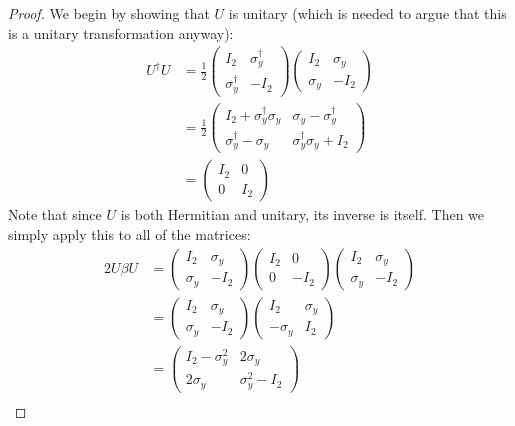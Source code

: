 \begin{proof}
	We begin by showing that $U$ is unitary (which is needed to argue that this is a unitary transformation anyway):
	\begin{align*}
		U^\dagger U &= \frac{1}{2}\begin{pmatrix}  I_2 & \sigma_y^\dagger \\ \sigma_y^\dagger & -I_2\end{pmatrix} \begin{pmatrix} I_2 & \sigma_y \\ \sigma_y & -I_2 \end{pmatrix}\\
			    &=\frac{1}{2}\begin{pmatrix} I_2 + \sigma_y^\dagger\sigma_y & \sigma_y - \sigma_y^\dagger \\ \sigma_y^\dagger - \sigma_y & \sigma_y^\dagger\sigma_y + I_2 \end{pmatrix}  \\
			    &=  \begin{pmatrix} I_2 & 0 \\ 0 & I_2 \end{pmatrix} 
	\end{align*}
	Note that since $U$ is both Hermitian and unitary, its inverse is itself. Then we simply apply this to all of the matrices:
	\begin{align*}
		2U\beta U &=  \begin{pmatrix}  I_2 & \sigma_y \\ \sigma_y & -I_2\end{pmatrix} \begin{pmatrix} I_2 & 0 \\ 0 & -I_2 \end{pmatrix} \begin{pmatrix} I_2 & \sigma_y \\ \sigma_y & -I_2 \end{pmatrix}   \\
			  &=\begin{pmatrix} I_2 & \sigma_y \\ \sigma_y & -I_2 \end{pmatrix} \begin{pmatrix} I_2 & \sigma_y \\ -\sigma_y & I_2 \end{pmatrix}   \\
			  &= \begin{pmatrix} I_2 - \sigma_y^2 & 2\sigma_y \\ 2\sigma_y & \sigma_y^2 - I_2 \end{pmatrix}  \\

\end{align*}
\end{proof}
